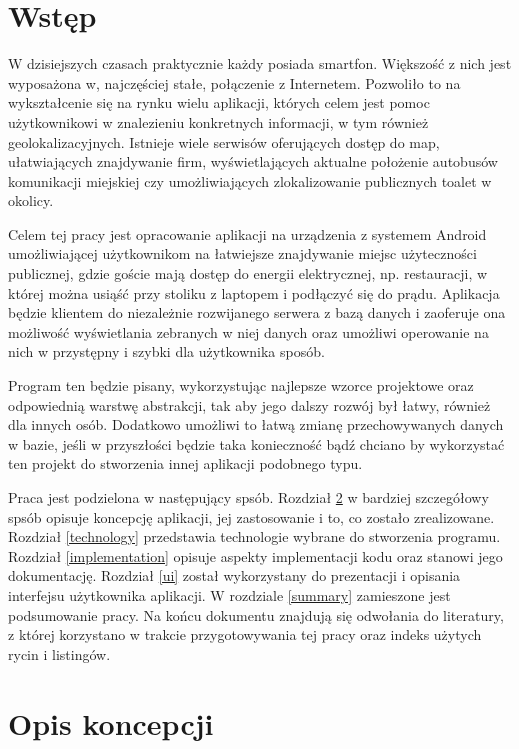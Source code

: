 \documentclass[polish,polish,a4paper,12pt]{article}
\let\sectioncmd\section
\renewcommand{\section}{\clearpage\sectioncmd}
\begin{document}
\tableofcontents

\pagestyle{plain}

\section{Wstęp}

W dzisiejszych czasach praktycznie każdy posiada smartfon. Większość z nich jest wyposażona w, najczęściej stałe, połączenie z Internetem. Pozwoliło to na wykształcenie się na rynku wielu aplikacji, których celem jest pomoc użytkownikowi w znalezieniu konkretnych informacji, w tym również geolokalizacyjnych. Istnieje wiele serwisów oferujących dostęp do map, ułatwiających znajdywanie firm, wyświetlających aktualne położenie autobusów komunikacji miejskiej czy umożliwiających zlokalizowanie publicznych toalet w okolicy.

Celem tej pracy jest opracowanie aplikacji na urządzenia z systemem Android umożliwiającej użytkownikom na łatwiejsze znajdywanie miejsc użyteczności publicznej, gdzie goście mają dostęp do energii elektrycznej, np. restauracji, w której można usiąść przy stoliku z laptopem i podłączyć się do prądu. Aplikacja będzie klientem do niezależnie rozwijanego serwera z bazą danych i zaoferuje ona możliwość wyświetlania zebranych w niej danych oraz umożliwi operowanie na nich w przystępny i szybki dla użytkownika sposób.

Program ten będzie pisany, wykorzystując najlepsze wzorce projektowe oraz odpowiednią warstwę abstrakcji, tak aby jego dalszy rozwój był łatwy, również dla innych osób. Dodatkowo umożliwi to łatwą zmianę przechowywanych danych w bazie, jeśli w przyszłości będzie taka konieczność bądź chciano by wykorzystać ten projekt do stworzenia innej aplikacji podobnego typu.

Praca jest podzielona w następujący spsób. Rozdział \ref{concept} w bardziej szczegółowy spsób opisuje koncepcję aplikacji, jej zastosowanie i to, co zostało zrealizowane. Rozdział \ref{technology} przedstawia technologie wybrane do stworzenia programu. Rozdział \ref{implementation} opisuje aspekty implementacji kodu oraz stanowi jego dokumentację. Rozdział \ref{ui} został wykorzystany do prezentacji i opisania interfejsu użytkownika aplikacji. W rozdziale \ref{summary} zamieszone jest podsumowanie pracy. Na końcu dokumentu znajdują się odwołania do literatury, z której korzystano w trakcie przygotowywania tej pracy oraz indeks użytych rycin i listingów.

\section{Opis koncepcji}\label{concept}
\end{document}
